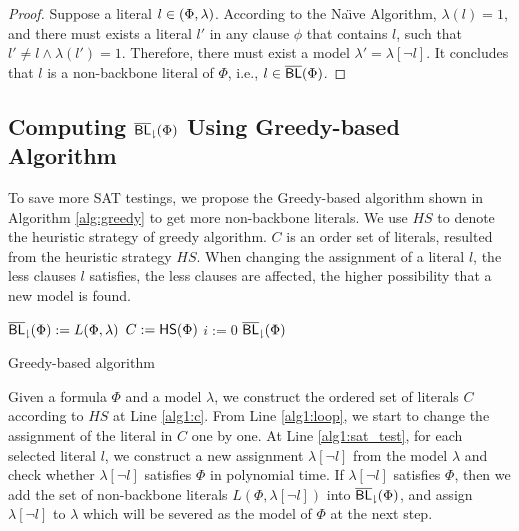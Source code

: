 \begin{proof}
Suppose a literal $l\in\relax(\Phi,\lambda)$. According to the Na\"{\i}ve Algorithm, $\lambda(l)=1$, and there must exists a literal $l'$ in any clause $\phi$ that contains $l$, such that $l'\neq l\wedge\lambda(l')=1$. Therefore, there must exist a model $\lambda'=\lambda[\neg l]$. It concludes that $l$ is a non-backbone literal of $\Phi$, i.e., $l\in\overline{\textsf{BL}}(\Phi)$.
\end{proof}

\medskip

\subsection{Computing ${\sf \overline{BL}_\downharpoonright}(\Phi)$ Using Greedy-based Algorithm}

To save more SAT testings, we propose the Greedy-based algorithm shown in Algorithm \ref{alg:greedy} to get more non-backbone literals. We use $HS$ to denote the heuristic strategy of greedy algorithm. 
$C$ is an order set of literals, resulted from the heuristic strategy $HS$.
When changing the assignment of a literal $l$, the less clauses $l$ satisfies, the less clauses are affected, the higher possibility that a new model is found.

\begin{algorithm2e}
\SetAlgoShortEnd
\SetFillComment
{}
${\sf \overline{BL}_\downharpoonright}(\Phi):=L(\Phi,\lambda)$\; \label{alg1:init}
$C:={\sf HS}(\Phi)$\; \label{alg1:c}
$i:=0$\;
\Return ${\sf \overline{BL}_\downharpoonright}(\Phi)$\;
\caption{Greedy-based algorithm}
\label{alg:greedy}
\end{algorithm2e}
Given a formula $\Phi$ and a model $\lambda$, we construct the ordered set of literals $C$ according to $HS$ at Line \ref{alg1:c}. From Line \ref{alg1:loop}, we start to change the assignment of the literal in $C$ one by one. At Line \ref{alg1:sat_test}, for each selected literal $l$, we construct a new assignment $\lambda[\neg l]$ from the model
$\lambda$ and check whether  $\lambda[\neg l]$ satisfies $\Phi$ in polynomial time. If $\lambda[\neg l]$ satisfies $\Phi$, then we add the set of non-backbone literals $L(\Phi,\lambda[\neg l])$ into ${\sf \overline{BL}_\downharpoonright}(\Phi)$, and
assign $\lambda[\neg l]$ to $\lambda$ which will be severed as the model of $\Phi$ at the next step.

